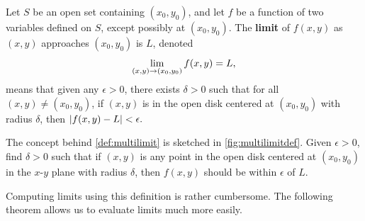 \begin{definition}\label{def:multilimit}%
Let $S$ be an open set containing $(x_0,y_0)$, and let $f$ be a function of two variables defined on $S$, except possibly at $(x_0,y_0)$. 
The \textbf{limit} of $f(x,y)$ as $(x,y)$ approaches $(x_0,y_0)$ is $L$, denoted
\[\displaystyle \lim_{(x,y)\to (x_0,y_0)} f(x,y) = L,\]
means that given any $\epsilon>0$, there exists $\delta>0$ such that for all  $(x,y)\neq (x_0,y_0)$, if $(x,y)$ is in the open disk centered at $(x_0,y_0)$ with radius $\delta$, then $\left\lvert f(x,y)-L \right\rvert<\epsilon.$
\end{definition}


The concept behind \autoref{def:multilimit} is sketched in \autoref{fig:multilimitdef}. Given $\epsilon>0$, find $\delta>0$ such that if $(x,y)$ is any point in the open disk centered at $(x_0,y_0)$ in the $x$-$y$ plane with radius $\delta$, then $f(x,y)$ should be within $\epsilon$ of $L$. 

Computing limits using this definition is rather cumbersome. The following theorem allows us to evaluate limits much more easily.

